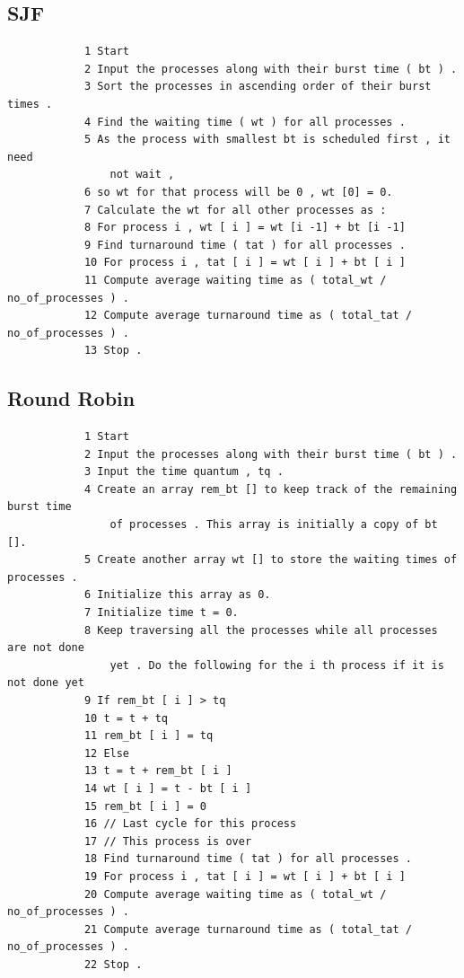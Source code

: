 \documentclass[13pt,oneside]{book}
\begin{document}
    \subsection*{SJF}
        \begin{verbatim}
            1 Start
            2 Input the processes along with their burst time ( bt ) .
            3 Sort the processes in ascending order of their burst times .
            4 Find the waiting time ( wt ) for all processes .
            5 As the process with smallest bt is scheduled first , it need
                not wait ,
            6 so wt for that process will be 0 , wt [0] = 0.
            7 Calculate the wt for all other processes as :
            8 For process i , wt [ i ] = wt [i -1] + bt [i -1]
            9 Find turnaround time ( tat ) for all processes .
            10 For process i , tat [ i ] = wt [ i ] + bt [ i ]
            11 Compute average waiting time as ( total_wt / no_of_processes ) .
            12 Compute average turnaround time as ( total_tat / no_of_processes ) .
            13 Stop .
        \end{verbatim}  
        
    \subsection*{Round Robin}
        \begin{verbatim}
            1 Start
            2 Input the processes along with their burst time ( bt ) .
            3 Input the time quantum , tq .
            4 Create an array rem_bt [] to keep track of the remaining burst time
                of processes . This array is initially a copy of bt [].
            5 Create another array wt [] to store the waiting times of processes .
            6 Initialize this array as 0.
            7 Initialize time t = 0.
            8 Keep traversing all the processes while all processes are not done
                yet . Do the following for the i th process if it is not done yet
            9 If rem_bt [ i ] > tq
            10 t = t + tq
            11 rem_bt [ i ] = tq
            12 Else
            13 t = t + rem_bt [ i ]
            14 wt [ i ] = t - bt [ i ]
            15 rem_bt [ i ] = 0
            16 // Last cycle for this process
            17 // This process is over
            18 Find turnaround time ( tat ) for all processes .
            19 For process i , tat [ i ] = wt [ i ] + bt [ i ]
            20 Compute average waiting time as ( total_wt / no_of_processes ) .
            21 Compute average turnaround time as ( total_tat / no_of_processes ) .
            22 Stop .
        \end{verbatim}
        
\end{document}
